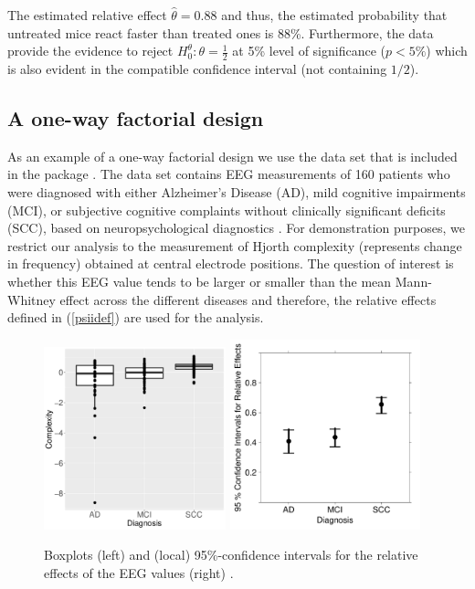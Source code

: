 The estimated relative effect $\widehat{\theta}=0.88$ and thus, the estimated 
probability that untreated mice react faster than treated ones is 88\%. 
Furthermore, the data provide the evidence to reject $H_0^\theta: \theta = 
\frac12$ at 5\% level of significance ($p<5\%$) which is also evident in the 
compatible confidence interval (not containing $1/2$).

\subsection{A one-way factorial design}

As an example of a one-way factorial design we use the data set  that 
is included in the package  
\citep{friedrich2019manovarm,MANOVARM}. The data set contains EEG measurements 
of 160 patients who were diagnosed with either Alzheimer's Disease (AD), mild 
cognitive impairments (MCI), or subjective cognitive complaints without 
clinically significant deficits (SCC), based on neuropsychological diagnostics 
\citep{bathke2018testing}. For demonstration purposes, we restrict our analysis 
to the measurement of Hjorth complexity (represents change in frequency) obtained at central electrode 
positions. The question of interest is whether this EEG value tends to be larger or smaller than the mean Mann-Whitney effect across the different diseases and therefore, the relative effects defined in (\ref{psiidef})  are used for the analysis. 


\begin{figure}[t!]
	\centering
	\includegraphics[width=0.47\textwidth]{boxplot_EEG}
		\includegraphics[width=0.49\textwidth]{CI_EEG}
	\caption{\label{fig:EEG} Boxplots (left) and (local) 95\%-confidence intervals for the relative effects of the EEG values (right) .}
\end{figure}



